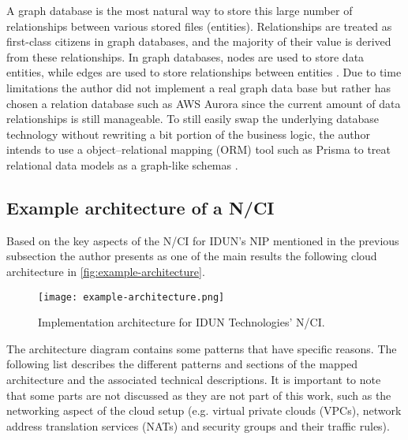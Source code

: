 A graph database is the most natural way to store this large number of relationships between various stored files (entities). Relationships are treated as first-class citizens in graph databases, and the majority of their value is derived from these relationships. In graph databases, nodes are used to store data entities, while edges are used to store relationships between entities \citep{amazon_web_services_inc_what_nodate}. Due to time limitations the author did not implement a real graph data base but rather has chosen a relation database such as AWS Aurora since the current amount of data relationships is still manageable. To still easily swap the underlying database technology without rewriting a bit portion of the business logic, the author intends to use a object–relational mapping (ORM) tool such as Prisma to treat relational data models as a graph-like schemas \citep{prisma_data_nodate}.

\subsection{Example architecture of a N/CI}
\label{chapter5-example-architecture-of-a-nci}

Based on the key aspects of the N/CI for IDUN's NIP mentioned in the previous subsection the author presents as one of the main results the following cloud architecture in \autoref{fig:example-architecture}.

\begin{figure}[!ht]
  \centering
  \texttt{[image: example-architecture.png]}
  \caption{Implementation architecture for IDUN Technologies' N/CI.}
  \label{fig:example-architecture}
\end{figure}

The architecture diagram contains some patterns that have specific reasons. The following list describes the different patterns and sections of the mapped architecture and the associated technical descriptions. It is important to note that some parts are not discussed as they are not part of this work, such as the networking aspect of the cloud setup (e.g. virtual private clouds (VPCs), network address translation services (NATs) and security groups and their traffic rules).



